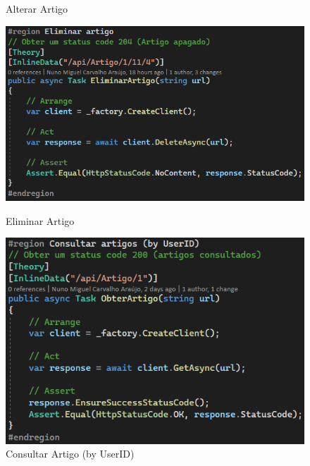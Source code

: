 \begin{figure}[!htbp]
\begin{minipage}[b]{0.4\textwidth}
    \caption{Alterar Artigo}
    \label{d.unitario}
  \end{minipage}
  \centering
  \begin{minipage}[b]{0.4\textwidth}
    \includegraphics[width=\textwidth]{Figuras/TestesUnitarios/Artigo/Eliminar Artigo.png}
    \caption{Eliminar Artigo}
    \label{d.unitario}
  \end{minipage}
  \hfill
  \begin{minipage}[b]{0.4\textwidth}
    \includegraphics[width=\textwidth]{Figuras/TestesUnitarios/Artigo/Consultar artigos (by UserID).png}
    \caption{Consultar Artigo (by UserID)}
    \label{d.unitario}
  \end{minipage}
  \begin{minipage}[b]{0.4\textwidth}

\end{minipage}
\end{figure}
